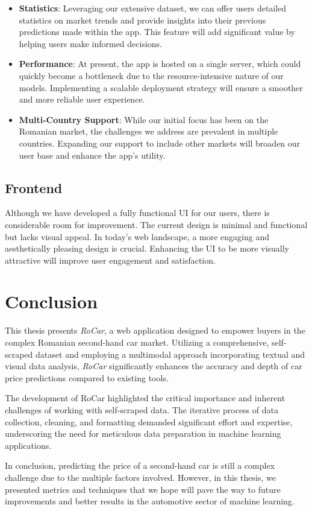 \begin{itemize}
\item \textbf{Statistics}: Leveraging our extensive dataset, we can offer users detailed statistics on market trends and provide insights into their previous predictions made within the app. This feature will add significant value by helping users make informed decisions.
\item \textbf{Performance}: At present, the app is hosted on a single server, which could quickly become a bottleneck due to the resource-intensive nature of our models. Implementing a scalable deployment strategy will ensure a smoother and more reliable user experience.
\item \textbf{Multi-Country Support}: While our initial focus has been on the Romanian market, the challenges we address are prevalent in multiple countries. Expanding our support to include other markets will broaden our user base and enhance the app's utility.
\end{itemize}

\subsection{Frontend}

Although we have developed a fully functional UI for our users, there is considerable room for improvement. The current design is minimal and functional but lacks visual appeal. In today's web landscape, a more engaging and aesthetically pleasing design is crucial. Enhancing the UI to be more visually attractive will improve user engagement and satisfaction.

\section{Conclusion}

This thesis presents \textit{RoCar}, a web application designed to empower buyers in the complex Romanian second-hand car market. Utilizing a comprehensive, self-scraped dataset and employing a multimodal approach incorporating textual and visual data analysis, \textit{RoCar} significantly enhances the accuracy and depth of car price predictions compared to existing tools.

The development of RoCar highlighted the critical importance and inherent challenges of working with self-scraped data. The iterative process of data collection, cleaning, and formatting demanded significant effort and expertise, underscoring the need for meticulous data preparation in machine learning applications.

In conclusion, predicting the price of a second-hand car is still a complex challenge due to the multiple factors involved. However, in this thesis, we presented metrics and techniques that we hope will pave the way to future improvements and better results in the automotive sector of machine learning.
